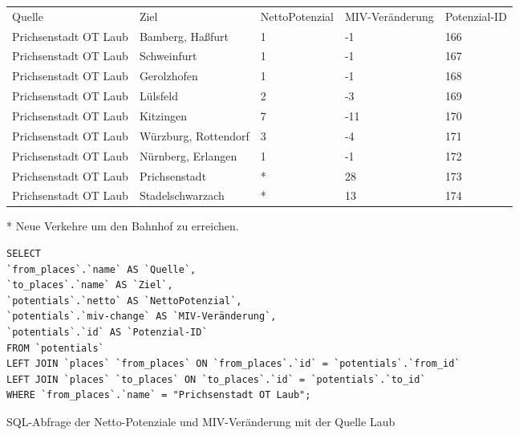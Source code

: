 \begin{tabular}{ l  l  l  l  l }
Quelle & Ziel & NettoPotenzial & MIV-Veränderung & Potenzial-ID\\ 
Prichsenstadt OT Laub & Bamberg, Haßfurt & 1 & -1 & 166\\ 
Prichsenstadt OT Laub & Schweinfurt & 1 & -1 & 167\\ 
Prichsenstadt OT Laub & Gerolzhofen & 1 & -1 & 168\\ 
Prichsenstadt OT Laub & Lülsfeld & 2 & -3 & 169\\ 
Prichsenstadt OT Laub & Kitzingen & 7 & -11 & 170\\ 
Prichsenstadt OT Laub & Würzburg, Rottendorf & 3 & -4 & 171\\ 
Prichsenstadt OT Laub & Nürnberg, Erlangen & 1 & -1 & 172\\ 
Prichsenstadt OT Laub & Prichsenstadt & * & 28 & 173\\ 
Prichsenstadt OT Laub & Stadelschwarzach & * & 13 & 174\\ 
\end{tabular}    
\newline
\newline
* Neue Verkehre um den Bahnhof zu erreichen.
\newline
\begin{listing}[htbp]
\begin{verbatim}
SELECT
`from_places`.`name` AS `Quelle`, 
`to_places`.`name` AS `Ziel`, 
`potentials`.`netto` AS `NettoPotenzial`, 
`potentials`.`miv-change` AS `MIV-Veränderung`, 
`potentials`.`id` AS `Potenzial-ID`
FROM `potentials`
LEFT JOIN `places` `from_places` ON `from_places`.`id` = `potentials`.`from_id`
LEFT JOIN `places` `to_places` ON `to_places`.`id` = `potentials`.`to_id`
WHERE `from_places`.`name` = "Prichsenstadt OT Laub";
\end{verbatim}
\caption{SQL-Abfrage der Netto-Potenziale und MIV-Veränderung mit der Quelle Laub}\label{lst-fz-laub}
\end{listing}